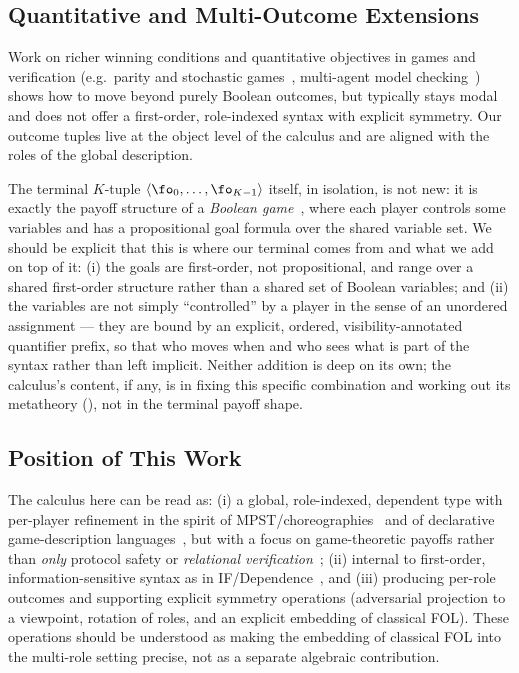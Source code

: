 \subsection{Quantitative and Multi-Outcome Extensions}
Work on richer winning conditions and quantitative objectives in games and verification (e.g.\ parity and stochastic games~\cite{Jurdzinski2000SPM,ChatterjeeMajumdarJurdzinski2004NashStochastic}, multi-agent model checking~\cite{LomuscioRaimondi2006MCMAS}) shows how to move beyond purely Boolean outcomes, but typically stays modal and does not offer a first-order, role-indexed syntax with explicit symmetry.
Our outcome tuples live at the object level of the calculus and are aligned with the roles of the global description.

The terminal $K$-tuple $\langle \fo_0,\dots,\fo_{K-1}\rangle$ itself, in isolation, is not new: it is exactly the payoff structure of a \emph{Boolean game}~\cite{HarrensteinEtAl2001BooleanGames}, where each player controls some variables and has a propositional goal formula over the shared variable set. We should be explicit that this is where our terminal comes from and what we add on top of it: (i) the goals are first-order, not propositional, and range over a shared first-order structure rather than a shared set of Boolean variables; and (ii) the variables are not simply ``controlled'' by a player in the sense of an unordered assignment --- they are bound by an explicit, ordered, visibility-annotated quantifier prefix, so that who moves when and who sees what is part of the syntax rather than left implicit. Neither addition is deep on its own; the calculus's content, if any, is in fixing this specific combination and working out its metatheory (), not in the terminal payoff shape.

\subsection{Position of This Work}
The calculus here can be read as:
(i) a global, role-indexed, dependent type with per-player refinement in the spirit of MPST/choreographies~\cite{HondaYoshidaCarbone2008MPST} and of declarative game-description languages~\cite{LoveHinrichsGenesereth2006GDL,PietteEtAl2021LudiiConcepts}, but with a focus on game-theoretic payoffs rather than \emph{only} protocol safety or \emph{relational verification}~\cite{fu2025dependentsessiontypesverified};
(ii) internal to first-order, information-sensitive syntax as in IF/Dependence~\cite{HintikkaSandu1989,MannSanduSevenster2011IFL}, and
(iii) producing per-role outcomes and supporting explicit symmetry operations (adversarial projection to a viewpoint, rotation of roles, and an explicit embedding of classical FOL).
These operations should be understood as making the embedding of classical FOL into the multi-role setting precise, not as a separate algebraic contribution.

